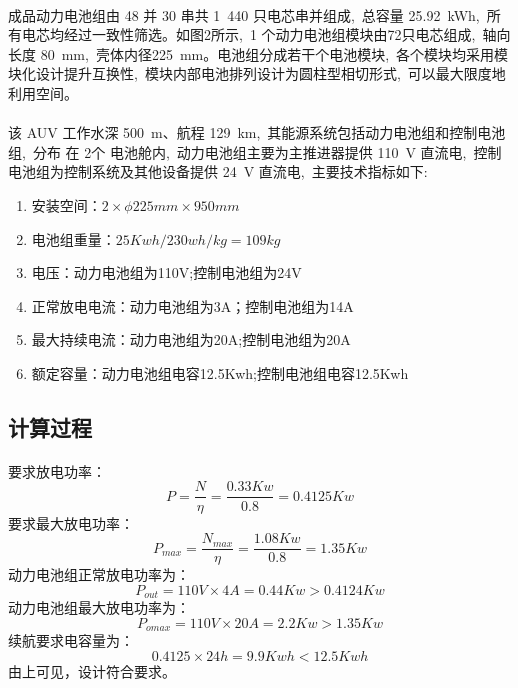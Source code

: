 \documentclass{ctexart}
\begin{document}
\paragraph{}成品动力电池组由 48 并 30 串共 1 440 只电芯串并组成, 总容量 25.92 kWh, 所有电芯均经过一致性筛选。如图2所示, 1 个动力电池组模块由72只电芯组成, 轴向长度 80 mm, 壳体内径225 mm。电池组分成若干个电池模块, 各个模块均采用模块化设计提升互换性, 模块内部电池排列设计为圆柱型相切形式, 可以最大限度地利用空间。
\paragraph{}该 AUV 工作水深 500 m、航程 129 km, 其能源系统包括动力电池组和控制电池组, 分布
            在 2个 电池舱内, 动力电池组主要为主推进器提供 110 V 直流电, 控制电池组为控制系统及其他设备提供 24 V 直流电, 主要技术指标如下: \\
            \begin{enumerate}
                \item 安装空间：$2\times \phi225mm\times 950mm $
                \item 电池组重量：$25Kwh/230wh/kg=109kg$
                \item 电压：动力电池组为110V;控制电池组为24V
                \item 正常放电电流：动力电池组为3A；控制电池组为14A
                \item 最大持续电流：动力电池组为20A;控制电池组为20A
                \item 额定容量：动力电池组电容12.5Kwh;控制电池组电容12.5Kwh
            \end{enumerate}
\subsection{计算过程}
\paragraph{}要求放电功率：\\
\[P=\frac{N}{\eta}=\frac{0.33Kw}{0.8}=0.4125Kw\]
要求最大放电功率：\\
\[P_{max}=\frac{N_{max}}{\eta}=\frac{1.08Kw}{0.8}=1.35Kw\]
动力电池组正常放电功率为：\\
\[P_{out}=110V\times 4A=0.44Kw > 0.4124Kw \]
动力电池组最大放电功率为：\\
\[P_{omax}=110V\times 20A=2.2Kw > 1.35Kw \]
续航要求电容量为：\\
\[0.4125\times 24h=9.9Kwh < 12.5Kwh\]
由上可见，设计符合要求。
\end{document}
